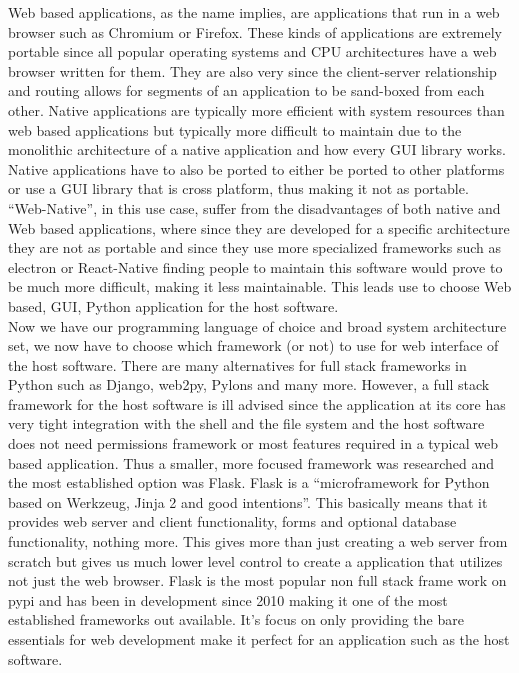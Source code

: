 \documentclass[12pt]{article}
\begin{document}
Web based applications, as the name implies, are applications that run in a web browser such as Chromium or Firefox. These kinds of applications are extremely portable since all popular operating systems and CPU architectures have a web browser written for them. They are also very since the client-server relationship and routing allows for segments of an application to be sand-boxed from each other. Native applications are typically more efficient with system resources than web based applications but typically more difficult to maintain due to the monolithic architecture of a native application and how every GUI library works. Native applications have to also be ported to either be ported to other platforms or use a GUI library that is cross platform, thus making it not as portable. ``Web-Native'', in this use case, suffer from the disadvantages of both native and Web based applications, where since they are developed for a specific architecture they are not as portable and since they use more specialized frameworks such as electron or React-Native finding people to maintain this software would prove to be much more difficult, making it less maintainable. This leads use to choose Web based, GUI, Python application for the host software.\\
Now we have our programming language of choice and broad system architecture set, we now have to choose which framework (or not) to use for web interface of the host software. There are many alternatives for full stack frameworks in Python such as Django, web2py, Pylons and many more. However, a full stack framework for the host software is ill advised since the application at its core has very tight integration with the shell and the file system and the host software does not need permissions framework or most features required in a typical web based application. Thus a smaller, more focused framework was researched and the most established option was Flask. Flask is a ``microframework for Python based on Werkzeug, Jinja 2 and good intentions''. This basically means that it provides web server and client functionality, forms and optional database functionality, nothing more. This gives more than just creating a web server from scratch but gives us much lower level control to create a application that utilizes not just the web browser. Flask is the most popular non full stack frame work on pypi and has been in development since 2010 making it one of the most established frameworks out available\cite{WebFrameworksPythonWiki}. It's focus on only providing the bare essentials for web development make it perfect for an application such as the host software.
\end{document}
